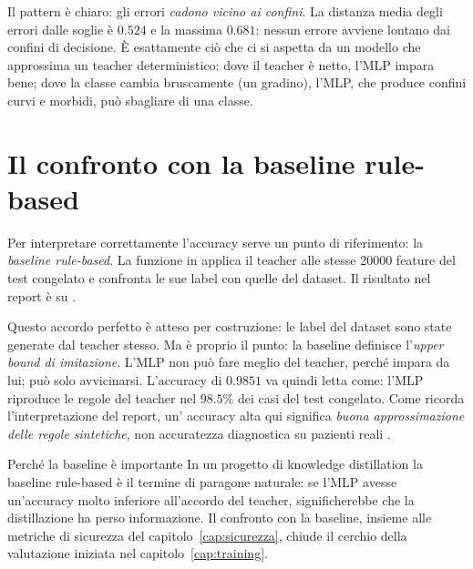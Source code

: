 Il pattern è chiaro: gli errori \emph{cadono vicino ai confini}. La distanza
media degli errori dalle soglie è $0.524$ e la massima $0.681$: nessun
errore avviene lontano dai confini di decisione. È esattamente ciò che ci si
aspetta da un modello che approssima un teacher deterministico: dove il
teacher è netto, l'MLP impara bene; dove la classe cambia bruscamente (un
gradino), l'MLP, che produce confini curvi e morbidi, può sbagliare di una
classe.

\section{Il confronto con la baseline rule-based}\label{sec:baseline-rule-based}

Per interpretare correttamente l'accuracy serve un punto di riferimento: la
\emph{baseline rule-based}. La funzione  in
 applica il teacher alle stesse 20000
feature del test congelato e confronta le sue label con quelle del dataset.
Il risultato nel report è  su
.

Questo accordo perfetto è atteso per costruzione: le label del dataset sono
state generate dal teacher stesso. Ma è proprio il punto: la baseline
definisce l'\emph{upper bound di imitazione}. L'MLP non può fare meglio del
teacher, perché impara da lui; può solo avvicinarsi. L'accuracy di $0.9851$
va quindi letta come: l'MLP riproduce le regole del teacher nel $98.5\%$ dei
casi del test congelato. Come ricorda l'interpretazione del report, un'
accuracy alta qui significa \emph{buona approssimazione delle regole
sintetiche}, non accuratezza diagnostica su pazienti reali
\cite{progetto2026}.

\begin{esempio}{Perché la baseline è importante}
In un progetto di knowledge distillation la baseline rule-based è il
termine di paragone naturale: se l'MLP avesse un'accuracy molto inferiore
all'accordo del teacher, significherebbe che la distillazione ha perso
informazione. Il confronto con la baseline, insieme alle metriche di
sicurezza del capitolo~\ref{cap:sicurezza}, chiude il cerchio della
valutazione iniziata nel capitolo~\ref{cap:training}.
\end{esempio}